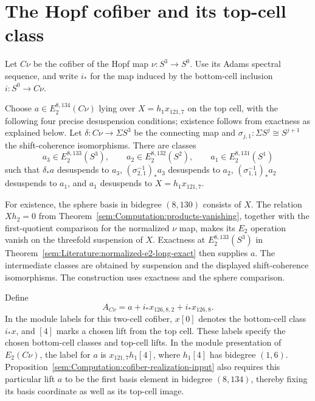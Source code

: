 \section{The Hopf cofiber and its top-cell class}

\begin{definition}
\label{sem:Computation:nu-cofiber-object}
\label{sem:Computation:top-cell-comparison}
\label{sem:Computation:nu-cofiber}
Let $C\nu$ be the cofiber of the Hopf map $\nu:S^3\to S^0$. Use its
Adams spectral sequence, and write $i_*$ for the map induced by the
bottom-cell inclusion $i:S^0\to C\nu$.

Choose $a\in E_2^{8,134}(C\nu)$ lying over
$X=h_1x_{121,7}$ on the top cell, with the following four precise
desuspension conditions; existence follows from exactness as explained below. Let
$\delta:C\nu\to\Sigma S^3$ be the connecting map and
$\sigma_{j,1}:\Sigma S^j\cong S^{j+1}$ the shift-coherence isomorphisms.
There are classes
\[
 a_3\in E_2^{8,133}(S^3),\qquad
 a_2\in E_2^{8,132}(S^2),\qquad
 a_1\in E_2^{8,131}(S^1)
\]
such that $\delta_*a$ desuspends to $a_3$,
$(\sigma_{2,1}^{-1})_*a_3$ desuspends to $a_2$,
$(\sigma_{1,1}^{-1})_*a_2$ desuspends to $a_1$, and $a_1$ desuspends to
$X=h_1x_{121,7}$.

For existence, the sphere basis in bidegree $(8,130)$ consists of $X$.
The relation $Xh_2=0$ from
Theorem~\ref{sem:Computation:products-vanishing}, together with the
first-quotient comparison for the normalized $\nu$ map, makes its
$E_2$ operation vanish on the threefold suspension of $X$.
Exactness at $E_2^{8,133}(S^3)$ in
Theorem~\ref{sem:Literature:normalized-e2-long-exact} then supplies $a$.
The intermediate classes are obtained by suspension and the displayed
shift-coherence isomorphisms. The construction uses exactness and the sphere comparison.

Define
\[
 A_{C\nu}=a+i_*x_{126,8,2}+i_*x_{126,8}.
\]
In the module labels for this two-cell cofiber, $x[0]$ denotes the
bottom-cell class $i_*x$, and $[4]$ marks a chosen lift from the top
cell. These labels specify the chosen bottom-cell classes and top-cell lifts.
In the module presentation of $E_2(C\nu)$, the label for $a$ is
$x_{121,7}h_1[4]$, where $h_1[4]$ has bidegree $(1,6)$.
Proposition~\ref{sem:Computation:cofiber-realization-input}
also requires this particular lift $a$ to be the first basis element
in bidegree $(8,134)$, thereby fixing its basis coordinate as well as
its top-cell image.
\end{definition}


